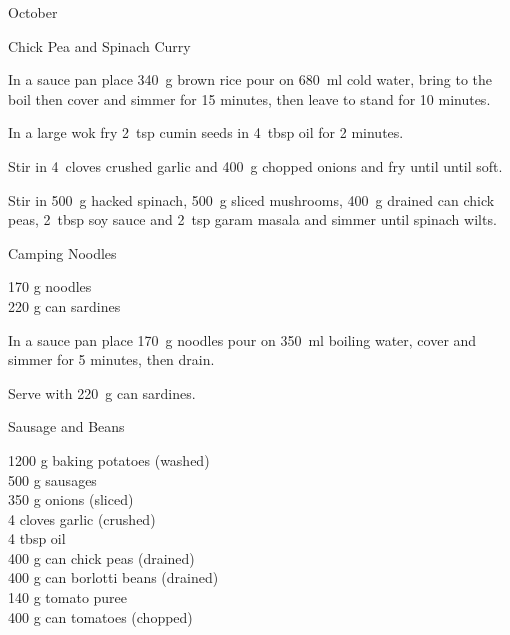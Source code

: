 \begin{menu}{October}
\begin{recipe}{2}{Chick Pea and Spinach Curry}
    \begin{instructions}
    \item 
    In a
    sauce pan
    place
    340~g  brown rice
    pour on
    680~ml  cold water,
    bring to the boil then cover and simmer for 15 minutes,
    then leave to stand for 10 minutes.
  \item 
        In a large wok fry
        2~tsp  cumin seeds
        in
        4~tbsp  oil
        for 2 minutes.
      \item 
        Stir in
        4~cloves crushed garlic
        and
        400~g chopped onions
        and fry until until soft.
      \item 
        Stir in
        500~g hacked spinach,
        500~g sliced mushrooms,
        400~g drained can chick peas,
        2~tbsp  soy sauce
        and
        2~tsp  garam masala
        and simmer until spinach wilts.
      
    \end{instructions}
    \end{recipe}%
  
    \begin{recipe}{1}{Camping Noodles}%
		\begin{ingredients}
		170 g noodles  \\
	220 g can sardines  \\
	
		\end{ingredients}
	
	
    \begin{instructions}
    \item 
    In a
    sauce pan
    place
    170~g  noodles
    pour on
    350~ml  boiling water,
    cover and simmer for 5 minutes, then drain.
  \item 
        Serve with 220~g  can sardines.
      
    \end{instructions}
    \end{recipe}%
  
    \begin{recipe}{2}{Sausage and Beans}%
		\begin{ingredients}
		1200 g baking potatoes (washed) \\
	500 g sausages  \\
	350 g onions (sliced) \\
	4 cloves garlic (crushed) \\
	4 tbsp oil  \\
	400 g can chick peas (drained) \\
	400 g can borlotti beans (drained) \\
	140 g tomato puree  \\
	400 g can tomatoes (chopped) \\
	

\end{ingredients}
\end{recipe}
\end{menu}
